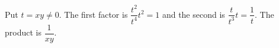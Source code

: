 Put $t=xy\ne0$. The first factor is $\dfrac{t^2}{t^4}t^2=1$ and the second is $\dfrac{t}{t^3}t=\dfrac{1}{t}$. The product is $\boxed{\dfrac{1}{xy}}$.
